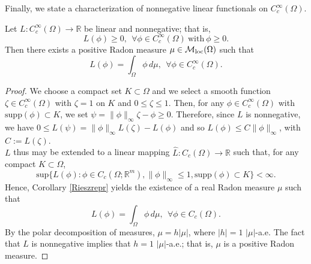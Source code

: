 Finally, we state a characterization of nonnegative linear functionals on $C^{\infty}_{c}(\Omega)$.

\begin{lemma} \label{Schwartzlemma} Let $L : C^{\infty}_{c}(\Omega) \to \mathbb{R}$ be linear and nonnegative; that is, 
\[L(\phi) \ge 0, \ \ \forall \phi \in C^{\infty}_{c}(\Omega) \ \text{with} \ \phi \ge 0.\] 
Then there exists a positive Radon measure $\mu \in \mathcal{M}_{\rm loc}(\Omega)$ such that
\[ L(\phi) = \int_{\Omega} \phi \, d \mu, \ \ \forall \phi \in C^{\infty}_{c}(\Omega). \]
\end{lemma}
\begin{proof} We choose a compact set $K \subset \Omega$ and we select a smooth function $\zeta \in C^{\infty}_{c}(\Omega)$ with $\zeta = 1$ on $K$ and $0 \le \zeta \le 1$. Then, for any $\phi \in C^{\infty}_{c}(\Omega)$ with $\mathrm{supp}(\phi) \subset K$, we set $\psi = \|\phi\|_{\infty} \zeta - \phi \ge 0$. Therefore, since $L$ is nonnegative, we have $0 \le L(\psi) = \|\phi\|_{\infty} L(\zeta) - L(\phi)$ and so $L(\phi) \le C \|\phi\|_{\infty}$, with $C := L(\zeta)$.
\\
$L$ thus may be extended to a linear mapping $\hat{L} : C_{c}(\Omega) \to \mathbb{R}$ such that, for any compact $K \subset \Omega$, 
\[ \mathrm{sup} \{ L(\phi) : \phi \in C_{c} (\Omega; \mathbb{R}^{m}), \|\phi\|_{\infty} \le 1, \mathrm{supp}(\phi) \subset K \} < \infty. \]
Hence, Corollary \ref{Rieszrepr} yields the existence of a real Radon measure $\mu$ such that
\[ L(\phi) = \int_{\Omega} \phi \, d \mu, \ \ \forall \phi \in C_{c}(\Omega). \]
By the polar decomposition of measures, $\mu = h |\mu|$, where $|h| = 1$ $|\mu|$-a.e. The fact that $L$ is nonnegative implies that $h = 1$ $|\mu|$-a.e.; that is, $\mu$ is a positive Radon measure. 
\end{proof}

